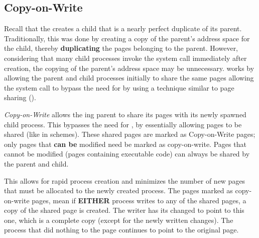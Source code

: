 \subsection{Copy-on-Write}\label{subsec:Memory_Copy_on_Write}
Recall that the   creates a child  that is a nearly perfect duplicate of its parent.
Traditionally, this was done by creating a copy of the parent’s address space for the child, thereby \textbf{duplicating} the pages belonging to the parent.
However, considering that many child processes invoke the  system call immediately after creation, the copying of the parent’s address space may be unnecessary.
 works by allowing the parent and child processes initially to share the same pages allowing the  system call to bypass the need for  by using a technique similar to page sharing ().

\begin{definition}\label{def:Memory_Copy_on_Write}
  \emph{Copy-on-Write} allows the ing parent  to share its pages with its newly spawned child process.
  This bypasses the need for , by essentially allowing pages to be shared (like in  schemes).
  These shared pages are marked as Copy-on-Write pages; only pages that \textbf{can be} modified need be marked as copy-on-write.
  Pages that cannot be modified (pages containing executable code) can always be shared by the parent and child.

  This allows for rapid process creation and minimizes the number of new pages that must be allocated to the newly created process.
  The pages marked as copy-on-write pages, mean if \textbf{EITHER} process writes to any of the shared pages, a copy of the shared page is created.
  The writer has its  changed to point to this one, which is a complete copy (except for the newly written changes).
  The process that did nothing to the page continues to point to the original page.
\end{definition}


